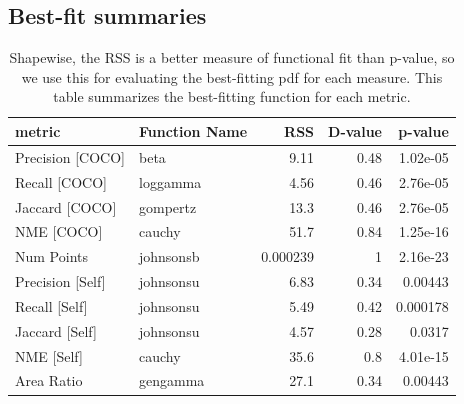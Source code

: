 \documentclass[12pt]{article}
\begin{document}
\newpage
\begin{appendices}
\section{Best-fit summaries}
\begin{table}[ht]
\centering
\begin{tabular}{llrrr}
\hline
 metric           & Function Name   &       RSS &   D-value &   p-value \\
\hline
 Precision [COCO] & beta            &  9.11     &      0.48 &  1.02e-05 \\
 Recall [COCO]    & loggamma        &  4.56     &      0.46 &  2.76e-05 \\
 Jaccard [COCO]   & gompertz        & 13.3      &      0.46 &  2.76e-05 \\
 NME [COCO]       & cauchy          & 51.7      &      0.84 &  1.25e-16 \\
 Num Points       & johnsonsb       &  0.000239 &      1    &  2.16e-23 \\
 Precision [Self] & johnsonsu       &  6.83     &      0.34 &  0.00443  \\
 Recall [Self]    & johnsonsu       &  5.49     &      0.42 &  0.000178 \\
 Jaccard [Self]   & johnsonsu       &  4.57     &      0.28 &  0.0317   \\
 NME [Self]       & cauchy          & 35.6      &      0.8  &  4.01e-15 \\
 Area Ratio       & gengamma        & 27.1      &      0.34 &  0.00443  \\
\hline
\end{tabular}
\caption{Shapewise, the RSS is a better measure of functional fit than p-value, so we use this for evaluating the best-fitting pdf for each measure. This table summarizes the best-fitting function for each metric.}
\label{overall_best_fits}
\end{table}


\end{appendices}
\end{document}
